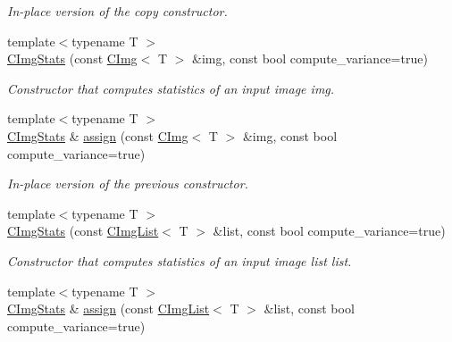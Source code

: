 \begin{DoxyCompactItemize}
\begin{DoxyCompactList}\small\item\em In-\/place version of the copy constructor. \item\end{DoxyCompactList}\item 
{\footnotesize template$<$typename T $>$ }\\\hyperlink{structcimg__library_1_1_c_img_stats_ae6f01dabd36b18ec51ae21a662b23413}{CImgStats} (const \hyperlink{structcimg__library_1_1_c_img}{CImg}$<$ T $>$ \&img, const bool compute\_\-variance=true)
\begin{DoxyCompactList}\small\item\em Constructor that computes statistics of an input image {\ttfamily img}. \item\end{DoxyCompactList}\item 
\hypertarget{structcimg__library_1_1_c_img_stats_a6c9dbbce7dbb3ed31d431d980625cb65}{
{\footnotesize template$<$typename T $>$ }\\\hyperlink{structcimg__library_1_1_c_img_stats}{CImgStats} \& \hyperlink{structcimg__library_1_1_c_img_stats_a6c9dbbce7dbb3ed31d431d980625cb65}{assign} (const \hyperlink{structcimg__library_1_1_c_img}{CImg}$<$ T $>$ \&img, const bool compute\_\-variance=true)}
\label{structcimg__library_1_1_c_img_stats_a6c9dbbce7dbb3ed31d431d980625cb65}

\begin{DoxyCompactList}\small\item\em In-\/place version of the previous constructor. \item\end{DoxyCompactList}\item 
{\footnotesize template$<$typename T $>$ }\\\hyperlink{structcimg__library_1_1_c_img_stats_abf1be70ffa308317d5f26f37b6e10f9c}{CImgStats} (const \hyperlink{structcimg__library_1_1_c_img_list}{CImgList}$<$ T $>$ \&list, const bool compute\_\-variance=true)
\begin{DoxyCompactList}\small\item\em Constructor that computes statistics of an input image list {\ttfamily list}. \item\end{DoxyCompactList}\item 
\hypertarget{structcimg__library_1_1_c_img_stats_aae7b9e63b900b74c8c717fce1cf0c9a5}{
{\footnotesize template$<$typename T $>$ }\\\hyperlink{structcimg__library_1_1_c_img_stats}{CImgStats} \& \hyperlink{structcimg__library_1_1_c_img_stats_aae7b9e63b900b74c8c717fce1cf0c9a5}{assign} (const \hyperlink{structcimg__library_1_1_c_img_list}{CImgList}$<$ T $>$ \&list, const bool compute\_\-variance=true)}
\label{structcimg__library_1_1_c_img_stats_aae7b9e63b900b74c8c717fce1cf0c9a5}


\end{DoxyCompactItemize}
